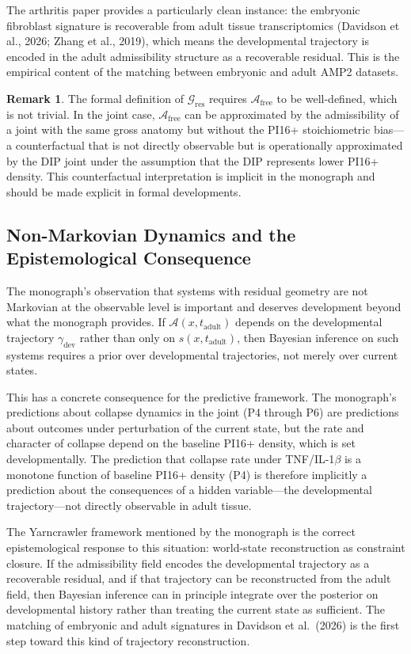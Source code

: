 \documentclass[12pt, a4paper]{article}
\theoremstyle{definition}
\newtheorem{remark}{Remark}[section]
\begin{document}
The arthritis paper provides a particularly clean instance: the embryonic fibroblast signature is recoverable from adult tissue transcriptomics (Davidson et al., 2026; Zhang et al., 2019), which means the developmental trajectory is encoded in the adult admissibility structure as a recoverable residual. This is the empirical content of the matching between embryonic and adult AMP2 datasets.

\begin{remark}
The formal definition of $\mathcal{G}_{\mathrm{res}}$ requires $\mathcal{A}_{\mathrm{free}}$ to be well-defined, which is not trivial. In the joint case, $\mathcal{A}_{\mathrm{free}}$ can be approximated by the admissibility of a joint with the same gross anatomy but without the PI16+ stoichiometric bias---a counterfactual that is not directly observable but is operationally approximated by the DIP joint under the assumption that the DIP represents lower PI16+ density. This counterfactual interpretation is implicit in the monograph and should be made explicit in formal developments.
\end{remark}

\subsection{Non-Markovian Dynamics and the Epistemological Consequence}

The monograph's observation that systems with residual geometry are not Markovian at the observable level is important and deserves development beyond what the monograph provides. If $\mathcal{A}(x, t_{\mathrm{adult}})$ depends on the developmental trajectory $\gamma_{\mathrm{dev}}$ rather than only on $s(x, t_{\mathrm{adult}})$, then Bayesian inference on such systems requires a prior over developmental trajectories, not merely over current states.

This has a concrete consequence for the predictive framework. The monograph's predictions about collapse dynamics in the joint (P4 through P6) are predictions about outcomes under perturbation of the current state, but the rate and character of collapse depend on the baseline PI16+ density, which is set developmentally. The prediction that collapse rate under TNF/IL-1$\beta$ is a monotone function of baseline PI16+ density (P4) is therefore implicitly a prediction about the consequences of a hidden variable---the developmental trajectory---not directly observable in adult tissue.

The Yarncrawler framework mentioned by the monograph is the correct epistemological response to this situation: world-state reconstruction as constraint closure. If the admissibility field encodes the developmental trajectory as a recoverable residual, and if that trajectory can be reconstructed from the adult field, then Bayesian inference can in principle integrate over the posterior on developmental history rather than treating the current state as sufficient. The matching of embryonic and adult signatures in Davidson et al.\ (2026) is the first step toward this kind of trajectory reconstruction.
\end{document}
